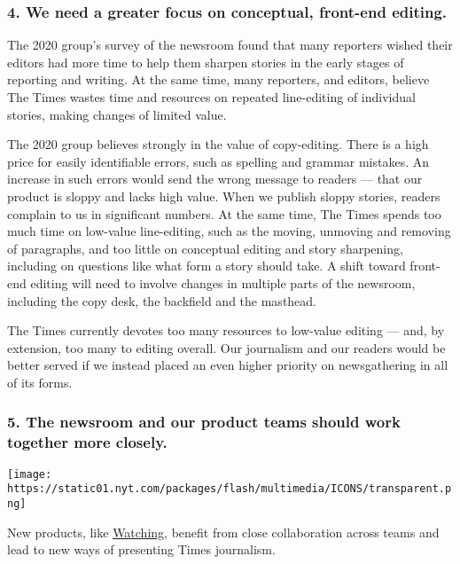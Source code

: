 \hypertarget{4-we-need-a-greater-focus-on-conceptual-front-end-editing}{%
\subsubsection{4. We need a greater focus on conceptual, front-end
editing.}\label{4-we-need-a-greater-focus-on-conceptual-front-end-editing}}

The 2020 group's survey of the newsroom found that many reporters wished
their editors had more time to help them sharpen stories in the early
stages of reporting and writing. At the same time, many reporters, and
editors, believe The Times wastes time and resources on repeated
line-editing of individual stories, making changes of limited value.

The 2020 group believes strongly in the value of copy-editing. There is
a high price for easily identifiable errors, such as spelling and
grammar mistakes. An increase in such errors would send the wrong
message to readers --- that our product is sloppy and lacks high value.
When we publish sloppy stories, readers complain to us in significant
numbers. At the same time, The Times spends too much time on low-value
line-editing, such as the moving, unmoving and removing of paragraphs,
and too little on conceptual editing and story sharpening, including on
questions like what form a story should take. A shift toward front-end
editing will need to involve changes in multiple parts of the newsroom,
including the copy desk, the backfield and the masthead.

The Times currently devotes too many resources to low-value editing ---
and, by extension, too many to editing overall. Our journalism and our
readers would be better served if we instead placed an even higher
priority on newsgathering in all of its forms.

\hypertarget{5-the-newsroom-and-our-product-teams-should-work-together-more-closely}{%
\subsubsection{5. The newsroom and our product teams should work
together more
closely.}\label{5-the-newsroom-and-our-product-teams-should-work-together-more-closely}}

\texttt{[image: https://static01.nyt.com/packages/flash/multimedia/ICONS/transparent.png]}

New products, like \href{https://www.nytimes.com/watching}{Watching},
benefit from close collaboration across teams and lead to new ways of
presenting Times journalism.

